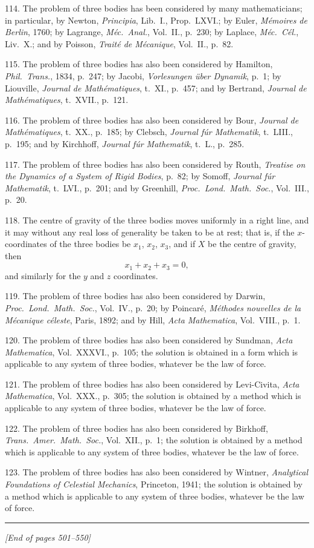 \documentclass[11pt,a4paper]{article}
\begin{document}
114. The problem of three bodies has been considered by many mathematicians; in particular, by Newton, \textit{Principia}, Lib.~I., Prop.~LXVI.; by Euler, \textit{M\'emoires de Berlin}, 1760; by Lagrange, \textit{M\'ec.\ Anal.}, Vol.~II., p.~230; by Laplace, \textit{M\'ec.\ C\'el.}, Liv.~X.; and by Poisson, \textit{Trait\'e de M\'ecanique}, Vol.~II., p.~82.

115. The problem of three bodies has also been considered by Hamilton, \textit{Phil.\ Trans.}, 1834, p.~247; by Jacobi, \textit{Vorlesungen \"uber Dynamik}, p.~1; by Liouville, \textit{Journal de Math\'ematiques}, t.~XI., p.~457; and by Bertrand, \textit{Journal de Math\'ematiques}, t.~XVII., p.~121.

116. The problem of three bodies has also been considered by Bour, \textit{Journal de Math\'ematiques}, t.~XX., p.~185; by Clebsch, \textit{Journal f\'ur Mathematik}, t.~LIII., p.~195; and by Kirchhoff, \textit{Journal f\'ur Mathematik}, t.~L., p.~285.

117. The problem of three bodies has also been considered by Routh, \textit{Treatise on the Dynamics of a System of Rigid Bodies}, p.~82; by Somoff, \textit{Journal f\'ur Mathematik}, t.~LVI., p.~201; and by Greenhill, \textit{Proc.\ Lond.\ Math.\ Soc.}, Vol.~III., p.~20.

118. The centre of gravity of the three bodies moves uniformly in a right line, and it may without any real loss of generality be taken to be at rest; that is, if the $x$-coordinates of the three bodies be $x_1$, $x_2$, $x_3$, and if $X$ be the centre of gravity, then
\[
x_1 + x_2 + x_3 = 0,
\]
and similarly for the $y$ and $z$ coordinates.

119. The problem of three bodies has also been considered by Darwin, \textit{Proc.\ Lond.\ Math.\ Soc.}, Vol.~IV., p.~20; by Poincar\'e, \textit{M\'ethodes nouvelles de la M\'ecanique c\'eleste}, Paris, 1892; and by Hill, \textit{Acta Mathematica}, Vol.~VIII., p.~1.

120. The problem of three bodies has also been considered by Sundman, \textit{Acta Mathematica}, Vol.~XXXVI., p.~105; the solution is obtained in a form which is applicable to any system of three bodies, whatever be the law of force.

121. The problem of three bodies has also been considered by Levi-Civita, \textit{Acta Mathematica}, Vol.~XXX., p.~305; the solution is obtained by a method which is applicable to any system of three bodies, whatever be the law of force.

122. The problem of three bodies has also been considered by Birkhoff, \textit{Trans.\ Amer.\ Math.\ Soc.}, Vol.~XII., p.~1; the solution is obtained by a method which is applicable to any system of three bodies, whatever be the law of force.

123. The problem of three bodies has also been considered by Wintner, \textit{Analytical Foundations of Celestial Mechanics}, Princeton, 1941; the solution is obtained by a method which is applicable to any system of three bodies, whatever be the law of force.

\vspace{1em}
\hrule
\vspace{1em}

\noindent\textit{[End of pages 501--550]}
\end{document}
